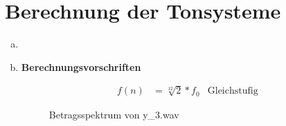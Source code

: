 \chapter{Berechnung der Tonsysteme}

\begin{enumerate}[a)]
\item

\item
\bfseries{Berechnungsvorschriften}

\begin{align*}
    f(n) &= \sqrt[12]{2} * f_0 & \text{Gleichstufig}
\end{align*} 


\begin{figure}[H]
    \center
    \caption{Betragsspektrum von y\_3.wav}
    \label{fig:bs3}
\end{figure}


\end{enumerate}